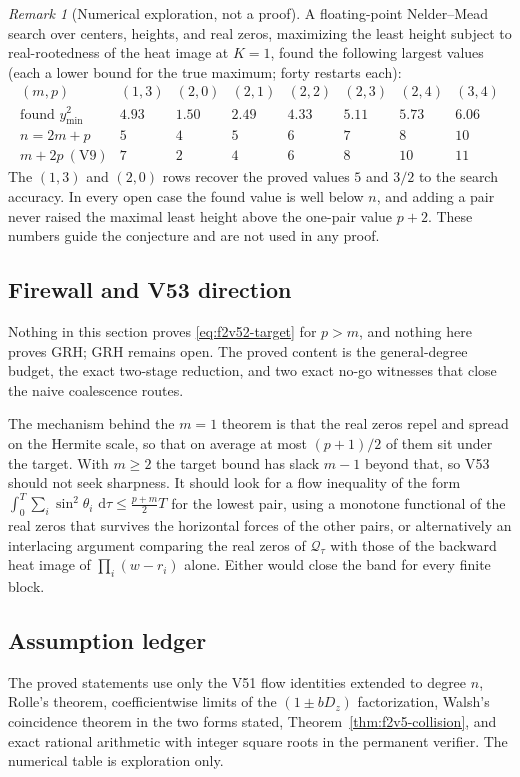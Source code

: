 \documentclass[11pt]{article}
\theoremstyle{definition}
\theoremstyle{remark}
\newtheorem{remark}[theorem]{Remark}
\newcommand{\dd}{\,\mathrm d}
\begin{document}
\begin{remark}[Numerical exploration, not a proof]
\label{rem:f2v52-numerics}
A floating-point Nelder--Mead search over centers, heights, and real
zeros, maximizing the least height subject to real-rootedness of the
heat image at \(K=1\), found the following largest values (each a lower
bound for the true maximum; forty restarts each):
\[
\begin{array}{c|ccccccc}
(m,p)&(1,3)&(2,0)&(2,1)&(2,2)&(2,3)&(2,4)&(3,4)\\ \hline
\text{found }y_{\min}^2&4.93&1.50&2.49&4.33&5.11&5.73&6.06\\
n=2m+p&5&4&5&6&7&8&10\\
m+2p\ (\text{V9})&7&2&4&6&8&10&11
\end{array}
\]
The \((1,3)\) and \((2,0)\) rows recover the proved values \(5\) and
\(3/2\) to the search accuracy.  In every open case the found value is
well below \(n\), and adding a pair never raised the maximal least
height above the one-pair value \(p+2\).  These numbers guide the
conjecture and are not used in any proof.
\end{remark}

\subsection*{Firewall and V53 direction}
\label{fire:f2v52}
Nothing in this section proves \eqref{eq:f2v52-target} for \(p>m\), and
nothing here proves GRH; GRH remains open.  The proved content is the
general-degree budget, the exact two-stage reduction, and two exact
no-go witnesses that close the naive coalescence routes.

The mechanism behind the \(m=1\) theorem is that the real zeros repel
and spread on the Hermite scale, so that on average at most
\((p+1)/2\) of them sit under the target.  With \(m\ge2\) the target
bound has slack \(m-1\) beyond that, so V53 should not seek sharpness.
It should look for a flow inequality of the form
\(\int_0^T\sum_i\sin^2\theta_i\,\dd\tau\le\tfrac{p+m}{2}T\) for the
lowest pair, using a monotone functional of the real zeros that survives
the horizontal forces of the other pairs, or alternatively an
interlacing argument comparing the real zeros of \(\mathcal Q_\tau\)
with those of the backward heat image of \(\prod_i(w-r_i)\) alone.
Either would close the band for every finite block.

\subsection*{Assumption ledger}
\label{ass:f2v52}
The proved statements use only the V51 flow identities extended to
degree \(n\), Rolle's theorem, coefficientwise limits of the
\((1\pm bD_z)\) factorization, Walsh's coincidence theorem in the two
forms stated, Theorem~\ref{thm:f2v5-collision}, and exact rational
arithmetic with integer square roots in the permanent verifier.  The
numerical table is exploration only.
\endgroup
\end{document}
